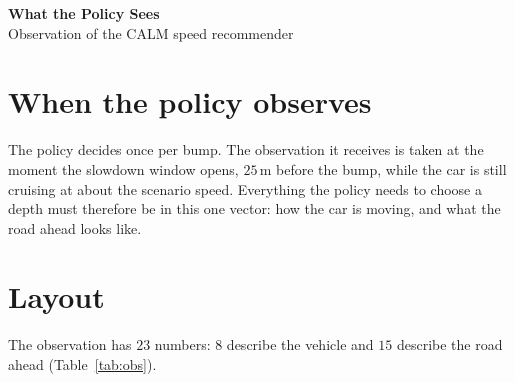 \documentclass[11pt]{article}
\begin{document}
\begin{center}
{\LARGE\bfseries What the Policy Sees}\\[0.5em]
{\large Observation of the CALM speed recommender}
\end{center}
\vspace{0.6em}

\section{When the policy observes}

The policy decides once per bump. The observation it receives is taken at the moment the slowdown window opens, $25$\,m before the bump, while the car is still cruising at about the scenario speed. Everything the policy needs to choose a depth must therefore be in this one vector: how the car is moving, and what the road ahead looks like.

\section{Layout}

The observation has $23$ numbers: $8$ describe the vehicle and $15$ describe the road ahead (Table~\ref{tab:obs}).
\end{document}

